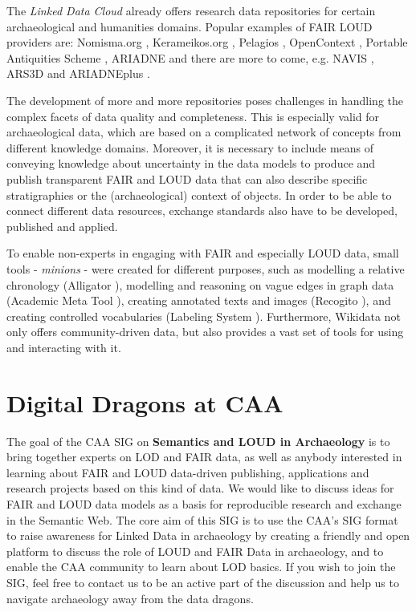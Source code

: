 \documentclass[twocolumn]{autart}
\begin{document}
The \textit{Linked Data Cloud} already offers research data repositories for certain archaeological and humanities domains. Popular examples of FAIR LOUD providers are: Nomisma.org \cite{gruber_linked_2018}, Kerameikos.org \cite{gruber_linked_2015}, Pelagios \cite{isaksen_pelagios_2014}, OpenContext \cite{kansa_publishing_2007}, Portable Antiquities Scheme \cite{harper_toys_2018}, ARIADNE \cite{consiglio_nazionale_delle_ricerche_isti_enabling_2017} and there are more to come, e.g. NAVIS \cite{thiery_taming_2018_1}, ARS3D \cite{thiery_ars3d_2019} and ARIADNEplus \cite{ariadneplus_ariadneplus_2019}. 

The development of more and more repositories poses challenges in handling the complex facets of data quality and completeness. This is especially valid for archaeological data, which are based on a complicated network of concepts from different knowledge domains. Moreover, it is necessary to include means of conveying knowledge about uncertainty in the data models to produce and publish transparent FAIR and LOUD data that can also describe specific stratigraphies or the (archaeological) context of objects. In order to be able to connect different data resources, exchange standards also have to be developed, published and applied.

To enable non-experts in engaging with FAIR and especially LOUD data, small tools - \textit{minions} - were created for different purposes, such as modelling a relative chronology (Alligator \cite{seidensticker_rdf_2018}), modelling and reasoning on vague edges in graph data (Academic Meta Tool \cite{thiery_taming_2018}), creating annotated texts and images (Recogito \cite{simon_linked_2017}), and creating controlled vocabularies (Labeling System \cite{thiery_labeling_2016}). Furthermore, Wikidata \cite{mika_introducing_2014} not only offers community-driven data, but also provides a vast set of tools for using and interacting with it.

\section{Digital Dragons at CAA}

The goal of the CAA SIG on \textbf{Semantics and LOUD in Archaeology} is to bring together experts on LOD and FAIR data, as well as anybody interested in learning about FAIR and LOUD data-driven publishing, applications and research projects based on this kind of data. We would like to discuss ideas for FAIR and LOUD data models as a basis for reproducible research and exchange in the Semantic Web. The core aim of this SIG is to use the CAA’s SIG format to raise awareness for Linked Data in archaeology by creating a friendly and open platform to discuss the role of LOUD and FAIR Data in archaeology, and to enable the CAA community to learn about LOD basics. If you wish to join the SIG, feel free to contact us to be an active part of the discussion \cite{thiery_caa_2019} and help us to navigate archaeology away from the data dragons.



\end{document}

